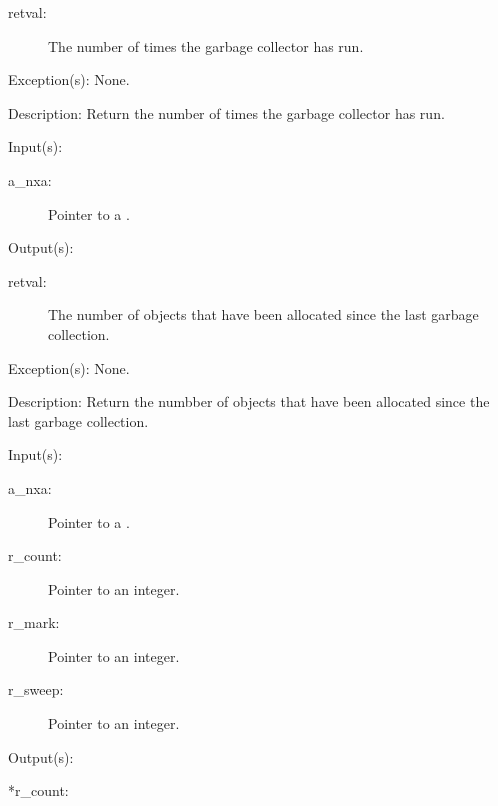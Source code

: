 \begin{capi}
\begin{capilist}
		\begin{description}\item[]
		\item[retval: ]
			The number of times the garbage collector has run.
		\end{description}
	\item[Exception(s): ] None.
	\item[Description: ]
		Return the number of times the garbage collector has run.
	\end{capilist}
\label{nxa_new_get}
	\begin{capilist}
	\item[Input(s): ]
		\begin{description}\item[]
		\item[a\_nxa: ]
			Pointer to a .
		\end{description}
	\item[Output(s): ]
		\begin{description}\item[]
		\item[retval: ]
			The number of objects that have been allocated since the
			last garbage collection.
		\end{description}
	\item[Exception(s): ] None.
	\item[Description: ]
		Return the numbber of objects that have been allocated since the
		last garbage collection.
	\end{capilist}
\label{nxa_current_get}
	\begin{capilist}
	\item[Input(s): ]
		\begin{description}\item[]
		\item[a\_nxa: ]
			Pointer to a \classname{nxa}.
		\item[r\_count: ]
			Pointer to an integer.
		\item[r\_mark: ]
			Pointer to an integer.
		\item[r\_sweep: ]
			Pointer to an integer.
		\end{description}
	\item[Output(s): ]
		\begin{description}\item[]
		\item[*r\_count: ]

\end{description}
\end{capilist}
\end{capi}
